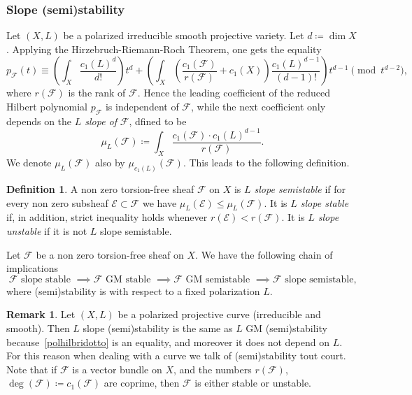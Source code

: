 \documentclass[11pt]{amsart}
\let\mathcal\mathscr
\def\cE{\mathcal{E}}
\def\cF{\mathcal{F}}
\theoremstyle{definition}
\newtheorem{dfn}[lmm]{Definition}
\newtheorem{rmk}[lmm]{Remark}
\theoremstyle{remark}
\begin{document}
\subsubsection{Slope (semi)stability}
%
Let $(X,L)$ be a polarized irreducible smooth projective variety.  Let $d\coloneqq \dim X$. Applying the Hirzebruch-Riemann-Roch Theorem, one gets the equality
%
\begin{equation}\label{polhilbridotto}
%
p_{\cF}(t)\equiv\left(\int_X\frac{c_1(L)^d}{d!}\right)t^d+
\left(\int_X\left(\frac{c_1(\cF)}{r(\cF)}+c_1(X)\right)\frac{c_1(L)^{d-1}}{(d-1)!}\right)t^{d-1}\pmod{t^{d-2}},
%
\end{equation}
%
where $r(\cF)$ is the rank of $\cF$. Hence the leading coefficient of the reduced Hilbert polynomial $p_{\cF}$ is independent of $\cF$, while the next coefficient only depends on the \emph{$L$ slope of} $\cF$, dfined to be
\begin{equation}\label{pendenza}
%
\mu_{L}(\cF)\coloneqq
\int_X\frac{c_1(\cF) \cdot c_1(L)^{d-1}}{r(\cF)}.
%
\end{equation}
%
We denote $\mu_{L}(\cF)$ also by $\mu_{c_1(L)}(\cF)$.
This leads to the following definition.
%
\begin{dfn}\label{dfn:penstab}
%
A non zero torsion-free sheaf $\cF$ on $X$ is \emph{$L$ slope semistable} if for every non zero subsheaf 
$\cE\subset \cF$ 
we have $\mu_L(\cE)\le \mu_L(\cF)$.
It is \emph{$L$ slope stable} if, in addition, strict inequality holds whenever $r(\cE)<r(\cF)$.  It is \emph{$L$ slope unstable} if it is not 
$L$ slope semistable.

%
\end{dfn}
%
Let  $\cF$ be a non zero torsion-free sheaf on $X$. We have the following chain of implications 
%
\begin{equation*}
%
\text{$\cF$  slope stable }\implies \text{$\cF$   GM stable }\implies \text{$\cF$    GM semistable }
\implies \text{$\cF$   slope semistable,}
% 
\end{equation*}
%
where (semi)stability is with respect to a fixed polarization $L$.
%
\begin{rmk}\label{rmk:stabcurva}
%
Let $(X,L)$ be a polarized projective curve (irreducible and smooth). Then $L$ slope (semi)stability is the same as $L$ GM (semi)stability because~\eqref{polhilbridotto} is an equality, and moreover it does not depend on $L$. For this reason  when dealing with a curve we talk of (semi)stability tout court. Note  that if $\cF$ is a vector bundle on $X$, and the numbers $r(\cF)$, $\deg(\cF)\coloneqq c_1(\cF)$ are coprime, then $\cF$ is either stable or unstable. 
%
\end{rmk}
\end{document}
